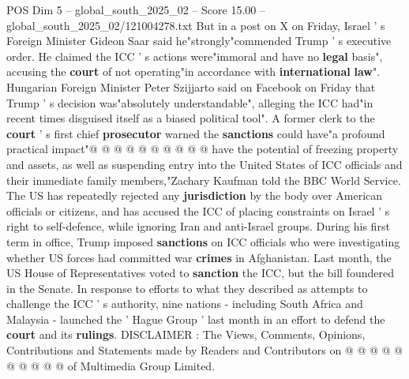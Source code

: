 \begin{textsample}{POS Dim 5 – global\_south\_2025\_02 – Score 15.00 – global\_south\_2025\_02/121004278.txt}
But in a post on X on Friday, Israel ' s Foreign Minister Gideon Saar said he"strongly"commended Trump ' s executive order.
He claimed the ICC ' s actions were"immoral and have no \textbf{legal} basis", accusing the \textbf{court} of not operating"in accordance with \textbf{international} \textbf{law}".
Hungarian Foreign Minister Peter Szijjarto said on Facebook on Friday that Trump ' s decision was"absolutely understandable", alleging the ICC had"in recent times disguised itself as a biased political tool".
A former clerk to the \textbf{court} ' s first chief \textbf{prosecutor} warned the \textbf{sanctions} could have"a profound practical impact"@ @ @ @ @ @ @ @ @ @ have the potential of freezing property and assets, as well as suspending entry into the United States of ICC officials and their immediate family members,"Zachary Kaufman told the BBC World Service.
The US has repeatedly rejected any \textbf{jurisdiction} by the body over American officials or citizens, and has accused the ICC of placing constraints on Israel ' s right to self-defence, while ignoring Iran and anti-Israel groups.
During his first term in office, Trump imposed \textbf{sanctions} on ICC officials who were investigating whether US forces had committed war \textbf{crimes} in Afghanistan.
Last month, the US House of Representatives voted to \textbf{sanction} the ICC, but the bill foundered in the Senate.
In response to efforts to what they described as attempts to challenge the ICC ' s authority, nine nations - including South Africa and Malaysia - launched the ' Hague Group ' last month in an effort to defend the \textbf{court} and its \textbf{rulings}.
DISCLAIMER : The Views, Comments, Opinions, Contributions and Statements made by Readers and Contributors on @ @ @ @ @ @ @ @ @ @ of Multimedia Group Limited.

\end{textsample}
